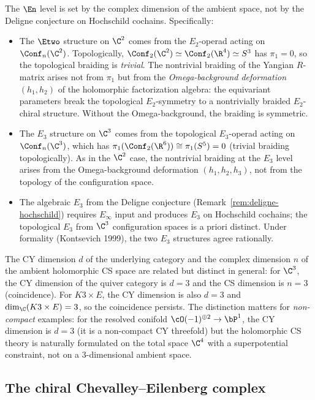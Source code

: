 \begin{remark}
\label{rem:en-from-dimension}
The $\En$ level is set by the complex dimension of the ambient space, not by the Deligne conjecture on Hochschild cochains. Specifically:
\begin{itemize}
 \item The $\Etwo$ structure on $\C^2$ comes from the $E_2$-operad acting on $\Conf_n(\C^2)$. Topologically, $\Conf_2(\C^2) \simeq \Conf_2(\R^4) \simeq S^3$ has $\pi_1 = 0$, so the topological braiding is \emph{trivial}. The nontrivial braiding of the Yangian $R$-matrix arises not from $\pi_1$ but from the \emph{Omega-background deformation} $(h_1, h_2)$ of the holomorphic factorization algebra: the equivariant parameters break the topological $E_2$-symmetry to a nontrivially braided $E_2$-chiral structure. Without the Omega-background, the braiding is symmetric.
 \item The $E_3$ structure on $\C^3$ comes from the topological $E_3$-operad acting on $\Conf_n(\C^3)$, which has $\pi_1(\Conf_2(\R^6)) \cong \pi_1(S^5) = 0$ (trivial braiding topologically). As in the $\C^2$ case, the nontrivial braiding at the $E_3$ level arises from the Omega-background deformation $(h_1, h_2, h_3)$, not from the topology of the configuration space.
 \item The algebraic $E_3$ from the Deligne conjecture (Remark~\ref{rem:deligne-hochschild}) requires $E_\infty$ input and produces $E_3$ on Hochschild cochains; the topological $E_3$ from $\C^3$ configuration spaces is a priori distinct. Under formality (Kontsevich 1999), the two $E_3$ structures agree rationally.
\end{itemize}
The CY dimension $d$ of the underlying category and the complex dimension $n$ of the ambient holomorphic CS space are related but distinct in general: for $\C^3$, the CY dimension of the quiver category is $d = 3$ and the CS dimension is $n = 3$ (coincidence). For $K3 \times E$, the CY dimension is also $d = 3$ and $\dim_\C(K3 \times E) = 3$, so the coincidence persists. The distinction matters for \emph{non-compact} examples: for the resolved conifold $\cO(-1)^{\oplus 2} \to \bP^1$, the CY dimension is $d = 3$ (it is a non-compact CY threefold) but the holomorphic CS theory is naturally formulated on the total space $\C^4$ with a superpotential constraint, not on a $3$-dimensional ambient space.
\end{remark}

\subsection{The chiral Chevalley--Eilenberg complex}
\label{subsec:chiral-ce}

